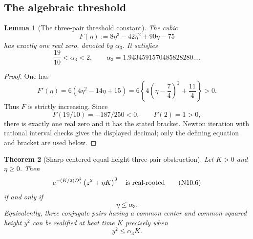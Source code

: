 \documentclass[11pt]{article}
\newtheorem{theorem}{Theorem}[section]
\newtheorem{lemma}[theorem]{Lemma}
\theoremstyle{definition}
\theoremstyle{remark}
\begin{document}
\subsection{The algebraic threshold}

\begin{lemma}[The three-pair threshold constant]
\label{lem:f2v10-alpha}
The cubic
\[
 F(\eta):=8\eta^3-42\eta^2+90\eta-75
 \tag{N10.2}
\]
has exactly one real zero, denoted by \(\alpha_3\).  It satisfies
\[
 \frac{19}{10}<\alpha_3<2,
 \qquad
 \alpha_3=1.9434591570485828280\ldots .
 \tag{N10.3}
\]
\end{lemma}

\begin{proof}
One has
\[
 F'(\eta)
 =6(4\eta^2-14\eta+15)
 =6\left\{4\left(\eta-\frac74\right)^2+\frac{11}{4}\right\}>0.
 \tag{N10.4}
\]
Thus \(F\) is strictly increasing.  Since
\[
 F(19/10)=-187/250<0,\qquad F(2)=1>0,
 \tag{N10.5}
\]
there is exactly one real zero and it has the stated bracket.  Newton
iteration with rational interval checks gives the displayed decimal; only
the defining equation and bracket are used below.
\end{proof}

\begin{theorem}[Sharp centered equal-height three-pair obstruction]
\label{thm:f2v10-triple}
Let \(K>0\) and \(\eta\ge0\).  Then
\[
 e^{-(K/2)D_z^2}\left(z^2+\eta K\right)^3
 \quad\hbox{is real-rooted}
 \tag{N10.6}
\]
if and only if
\[
 \boxed{\eta\le\alpha_3.}
 \tag{N10.7}
\]
Equivalently, three conjugate pairs having a common center and common
squared height \(y^2\) can be realified at heat time \(K\) precisely when
\[
 \boxed{y^2\le\alpha_3K.}
 \tag{N10.8}
\]
\end{theorem}
\end{document}
